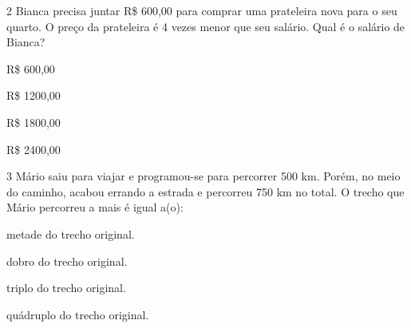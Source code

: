 \num{2} Bianca precisa juntar R\$ 600,00 para comprar uma prateleira nova para o
seu quarto. O preço da prateleira é 4 vezes menor que seu salário. Qual
é o salário de Bianca?

\begin{escolha}[itemsep=-5pt]
\item R\$ 600,00

\item R\$ 1200,00

\item R\$ 1800,00

\item R\$ 2400,00
\end{escolha}

\num{3} Mário saiu para viajar e programou-se para percorrer 500 km. Porém, no
meio do caminho, acabou errando a estrada e percorreu 750 km no total. O
trecho que Mário percorreu a mais é igual a(o):

\begin{escolha}[itemsep=-5pt]
\item metade do trecho original.

\item dobro do trecho original.

\item triplo do trecho original.

\item quádruplo do trecho original.
\end{escolha}